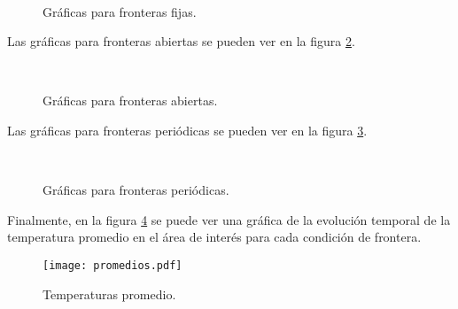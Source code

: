 \documentclass{article}
\begin{document}
\begin{figure}[h]
\centering
     \\
    \label{fig:fijas}
    \caption{Gráficas para fronteras fijas.}
\end{figure}

Las gráficas para fronteras abiertas se pueden ver en la figura \ref{fig:abiertas}.

\begin{figure}[h]
\centering
     \\
    \label{fig:abiertas}
    \caption{Gráficas para fronteras abiertas.}
\end{figure}

Las gráficas para fronteras periódicas se pueden ver en la figura \ref{fig:periodicas}.

\begin{figure}[h]
\centering
     \\
    \label{fig:periodicas}
    \caption{Gráficas para fronteras periódicas.}
\end{figure}

Finalmente, en la figura \ref{fig:promedios} se puede ver una gráfica de la evolución temporal de la temperatura promedio en el área de interés para cada condición de frontera.

\begin{figure}[h]
	\centering
	\texttt{[image: promedios.pdf]}
	\label{fig:promedios}
	\caption{Temperaturas promedio.}
\end{figure} 
\end{document}

